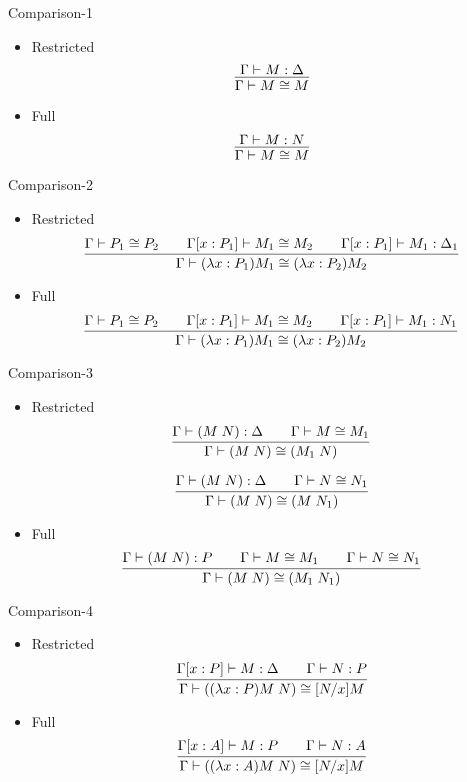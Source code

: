 \documentclass{beamer}
\begin{document}
\begin{frame}{Comparison-1}
\begin{itemize}
\item Restricted
$$\infer{\Gamma \vdash M \cong M}{\Gamma \vdash M: \Delta}$$  

\item Full
$$\infer{\Gamma \vdash M \cong M }{\Gamma \vdash M: N}$$  


\end{itemize}
\end{frame}


\begin{frame}{Comparison-2}
\begin{itemize}
\item Restricted
$$\infer{\Gamma \vdash (\lambda x:P_1) M_1 \cong (\lambda x : P_2) M_2} {\Gamma \vdash P_1 \cong P_2 & \quad \Gamma [x: P_1] \vdash M_1 \cong M_2 & \quad \Gamma [x: P_1] \vdash M_1 : \Delta_1} $$

\item Full
$$\infer{\Gamma \vdash (\lambda x:P_1) M_1 \cong (\lambda x : P_2) M_2} {\Gamma \vdash P_1 \cong P_2 & \quad \Gamma [x: P_1] \vdash M_1 \cong M_2 & \quad \Gamma [x: P_1] \vdash M_1 : N_1} $$


\end{itemize}
\end{frame}


\begin{frame}{Comparison-3}
\begin{itemize}
\item Restricted
$$\infer{\Gamma \vdash (M \; N) \cong (M_1 \; N)} {\Gamma \vdash (M \; N) : \Delta & \quad \Gamma \vdash M \cong M_1} $$

$$\infer{\Gamma \vdash (M \; N) \cong (M \; N_1)}{\Gamma \vdash (M \; N) : \Delta & \quad \Gamma \vdash N \cong N_1}$$

\item Full
$$\infer{\Gamma \vdash (M \; N) \cong (M_1 \; N_1)} {\Gamma \vdash (M \; N) : P & \quad \Gamma \vdash M \cong M_1 & \quad \Gamma \vdash N \cong N_1} $$

\end{itemize}
\end{frame}


\begin{frame}{Comparison-4}
\begin{itemize}
\item Restricted
$$\infer{\Gamma \vdash ((\lambda x : P) M \; N) \cong [N/x] M}{\Gamma[x:P]\vdash M:\Delta & \quad \Gamma \vdash N: P}$$
 
\item Full
$$\infer{\Gamma \vdash ((\lambda x : A) M \; N) \cong [N/x] M}{\Gamma[x:A] \vdash M:P & \quad \Gamma \vdash N: A}$$
 
\end{itemize}
\end{frame}
\end{document}
